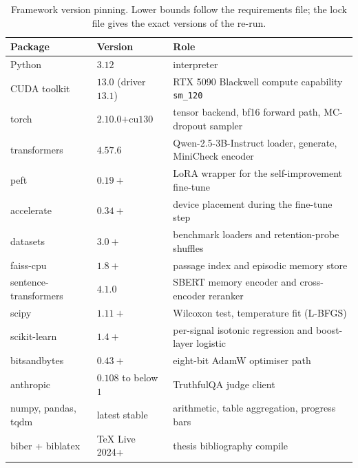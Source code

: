 \begin{table}[!ht]
\centering\footnotesize
\setlength{\tabcolsep}{5pt}
\renewcommand{\arraystretch}{1.1}
\begin{tabular}{@{}p{5.0cm}p{3.0cm}p{5.5cm}@{}}
\toprule
\textbf{Package} & \textbf{Version} & \textbf{Role} \\
\midrule
Python                & $3.12$                   & interpreter \\
CUDA toolkit          & $13.0$ (driver $13.1$)   & RTX 5090 Blackwell compute capability \texttt{sm\_120} \\
\midrule
torch                 & $2.10.0\text{+cu130}$    & tensor backend, bf16 forward path, MC-dropout sampler \\
transformers          & $4.57.6$                 & Qwen-2.5-3B-Instruct loader, generate, MiniCheck encoder \\
peft                  & $0.19+$                  & LoRA wrapper for the self-improvement fine-tune \\
accelerate            & $0.34+$                  & device placement during the fine-tune step \\
\midrule
datasets              & $3.0+$                   & benchmark loaders and retention-probe shuffles \\
faiss-cpu             & $1.8+$                   & passage index and episodic memory store \\
sentence-transformers & $4.1.0$                  & SBERT memory encoder and cross-encoder reranker \\
\midrule
scipy                 & $1.11+$                  & Wilcoxon test, temperature fit (L-BFGS) \\
scikit-learn          & $1.4+$                   & per-signal isotonic regression and boost-layer logistic \\
\midrule
bitsandbytes          & $0.43+$                  & eight-bit AdamW optimiser path \\
anthropic             & $0.108$ to below $1$     & TruthfulQA judge client \\
numpy, pandas, tqdm   & latest stable            & arithmetic, table aggregation, progress bars \\
\midrule
biber + biblatex      & TeX Live 2024+           & thesis bibliography compile \\
\bottomrule
\end{tabular}
\caption[Framework version pinning]{Framework version pinning. Lower bounds follow the requirements file; the lock file gives the exact versions of the re-run.}
\label{tab:app-repro-versions}
\end{table}

